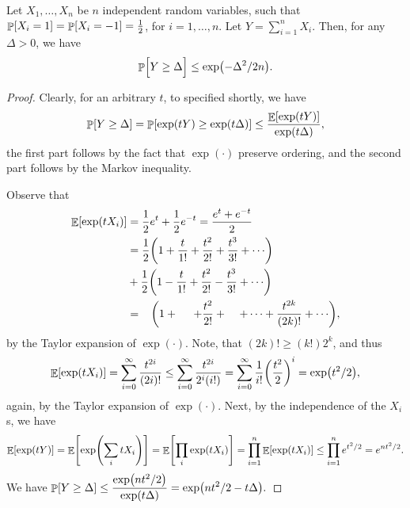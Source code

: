 \begin{fragment}{}
    \begin{theorem}
        Let $X_1, \ldots, X_n$ be $n$ independent random variables,
        such that $\Prob{X_i =1} =\Prob{X_i=-1} = \frac{1}{2}$, for
        $i=1,\ldots, n$. Let $Y = \sum_{i=1}^n X_i$. Then, for any
        $\Delta >0$, we have
        \begin{align*}
            \Prob{\Bigl. Y \geq \Delta} \leq \exp \pth{-\Delta^2/2n}.
        \end{align*}
    \end{theorem}%
\end{fragment}
%
\begin{proof}
    Clearly, for an arbitrary $t$, to specified shortly, we have
    \begin{align*}
        \Prob{Y \geq \Delta} = \Prob{\exp \pth{ t Y } \geq \exp
           \pth{t\Delta}} \leq \frac{\Ex{\exp \pth{t Y}}}{\exp
           \pth{t\Delta}},
    \end{align*}
    the first part follows by the fact that $\exp(\cdot)$ preserve
    ordering, and the second part follows by the Markov inequality.

    Observe that
    \begin{align*}
        \Ex{ \exp\pth{t X_i} }%
        &=%
        \frac{1}{2} e^{t} + \frac{1}{2}e^{-t} =
        \frac{e^t + e^{-t}}{2}\\
        &=%
        \frac{1}{2} \pth{1 + \frac{t}{1!} + \frac{t^2}{2!} +
           \frac{t^3}{3!} + \cdots}
        \\
        &+%
        \frac{1}{2}\pth{1 -\frac{t}{1!} + \frac{t^2}{2!} -
           \frac{t^3}{3!}
           + \cdots}\\
        &=%
        \;\; \;\pth{1 +\;\;\;\;\; + \frac{t^2}{2!} + \;\;\;\; +\cdots
           + \frac{t^{2k}}{(2k)!}  + \cdots},
    \end{align*}
    by the Taylor expansion of $\exp(\cdot)$. Note, that $(2k)!\geq
    (k!) 2^k$, and thus
    \begin{align*}
        \Ex{ \exp \pth{ t X_i } } = \sum_{i=0}^{\infty}
        \frac{t^{2i}}{(2i)!} \leq \sum_{i=0}^{\infty}
        \frac{t^{2i}}{2^i(i!)} = \sum_{i=0}^{\infty} \frac{1}{i!}\pth{
           \frac{t^2}{2}}^i = \exp \pth{t^2/2},
    \end{align*}
    again, by the Taylor expansion of $\exp(\cdot)$. Next, by the
    independence of the $X_i$s, we have
    \begin{align*}
        \Ex{\exp \pth{t Y}}%
        =%
        \Ex{\exp \pth{\sum_i t X_i}}%
        =%
        \Ex{\prod_i \exp\pth{t X_i}}%
        =%
        \prod_{i=1}^{n} \Ex{\exp\pth{t X_i}} \leq%
        \prod_{i=1}^{n} e^{t^2/2}%
        =%
        e^{n t^2/2}.
    \end{align*}
    We have
    \begin{math}
        \ds \Prob{Y \geq \Delta} \leq \frac{\exp\pth{n t^2/2}}{\exp
           \pth{t\Delta}} = \exp \pth{n t^2/2 - t\Delta}.
    \end{math}


\end{proof}
